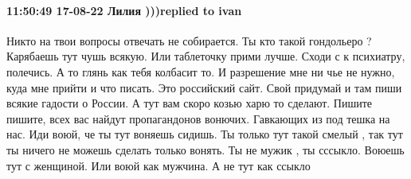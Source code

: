  
 
 
 
 

\paragraph{11:50:49 17-08-22 Лилия )))replied to ivan}

Никто на твои вопросы отвечать не собирается. Ты кто такой гондольеро ?
Карябаешь тут чушь всякую. Или таблеточку прими лучше. Сходи с к психиатру,
полечись. А то глянь как тебя колбасит то. И разрешение мне ни чье не нужно,
куда мне прийти и что писать. Это российский сайт. Свой придумай и там пиши
всякие гадости о России. А тут вам скоро козью харю то сделают. Пишите пишите,
всех вас найдут пропагандонов вонючих. Гавкающих из под тешка на нас. Иди воюй,
че ты тут воняешь сидишь. Ты только тут такой смелый , так тут ты ничего не
можешь сделать только вонять. Ты не мужик , ты сссыкло. Воюешь тут с женщиной.
Или воюй как мужчина. А не тут как ссыкло
